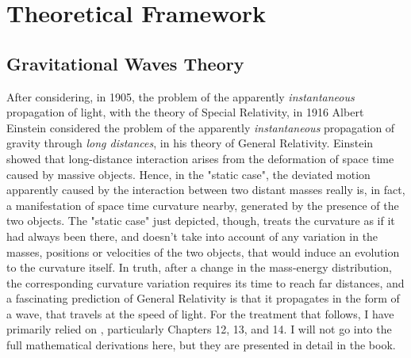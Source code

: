 \chapter{Theoretical Framework}


\section{Gravitational Waves Theory}
After considering, in 1905, the problem of the apparently \textit{instantaneous} propagation of light, with the theory of Special Relativity, in 1916 Albert Einstein considered the problem of the apparently \textit{instantaneous} propagation of gravity through \textit{long distances}, in his theory of General Relativity.
Einstein showed that long-distance interaction arises from the deformation of space time caused by massive objects.
Hence, in the "static case", the deviated motion apparently caused by the interaction between two distant masses really is, in fact, a manifestation of space time curvature nearby, generated by the presence of the two objects.
The "static case" just depicted, though, treats the curvature as if it had always been there, and doesn't take into account of any variation in the masses, positions or velocities of the two objects, that would induce an evolution to the curvature itself.
In truth, after a change in the mass-energy distribution, the corresponding curvature variation requires its time to reach far distances, and a fascinating prediction of General Relativity is that it propagates in the form of a wave, that travels at the speed of light.
For the treatment that follows, I have primarily relied on \cite{ferrari2020general}, particularly Chapters 12, 13, and 14.
I will not go into the full mathematical derivations here, but they are presented in detail in the book.

